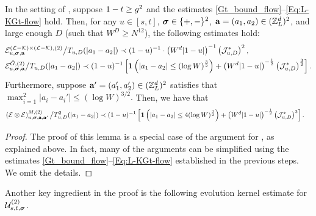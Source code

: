 \begin{lemma}\label{lem_dec_calE} In the setting of  , suppose $1-t\ge g^2$ and the estimates \eqref{Gt_bound_flow}--\eqref{Eq:L-KGt-flow} hold. Then, for any $u\in [s,t]$, ${\boldsymbol{\sigma}}\in\{+,-\}^2$, ${\mathbf{a}}=(a_1,a_2)\in({\mathbb Z}_L^d)^2$, and large enough $D$ (such that $W^D\ge N^{12}$), the following estimates hold:  
\begin{align}\label{res_deccalE_lk}
& {\mathcal E}^{(\mathcal L-\mathcal K)\times(\mathcal L-\mathcal K),(2)}_{u, {\boldsymbol{\sigma}},{\mathbf{a}}} \big/ 
  {T}_{u,D}(|a_1-a_2|) \prec  (1-u)^{-1}\cdot   \left(W^d|1-u|\right)^{-1}
 \left({\mathcal J}^{*}_{u,D} \right)^{2},\\
&\mathcal E^{{\mathring G},(2)}_{u, {\boldsymbol{\sigma}},{\mathbf{a}}}  \big/ 
 {T}_{u,D}(|a_1-a_2|)
  \prec (1-u)^{-1}\left[{{\bf 1}\left(|a_1-a_2|\le (\log W)^{\frac32}\right)  +  \left(W^d|1-u|\right)^{-\frac12}  \left({{\mathcal J}^{*}_{u,D}}\right)^{\frac32}  }\right].
 \label{res_deccalE_wG}
\end{align} 
Furthermore, suppose ${\mathbf{a}}'=(a_1',a_2')\in ({\mathbb Z}_L^d)^2$ satisfies that \(\max_{i=1}^2 |a_i-a_i'|\le (\log W)^{3/2}.\) Then, we have that 
\begin{align}
\label{res_deccalE_dif}
\left(
   \mathcal{E}\otimes  \mathcal{E} \right)^{M,(2)}
   _{u, {\boldsymbol{\sigma}}, {\mathbf{a}} ,{\mathbf{a}}'} \big/  
 {T}_{u,D}^2(|a_1-a_2|)
 & \prec (1-u)^{-1}\left[{{\bf 1}\left(|a_1-a_2|\le 4(\log W)^{\frac32}\right)  +  \left(W^d|1-u|\right)^{-\frac12} \left({\mathcal J}^{*}_{u,D} \right)^{3}}\right].   
\end{align} 
\end{lemma}
\begin{proof}
The proof of this lemma is a special case of the argument for \cite[Lemma 5.7]{YY_25}, as explained above. In fact, many of the arguments can be simplified using the estimates \eqref{Gt_bound_flow}--\eqref{Eq:L-KGt-flow} established in the previous steps. We omit the details.
\end{proof}

Another key ingredient in the proof is the following evolution kernel estimate for ${\mathcal U}^{(2)}_{s,t,{\boldsymbol{\sigma}}}$.  

